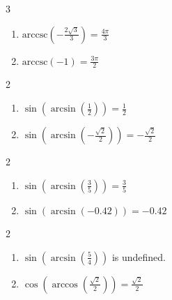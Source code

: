 \documentclass{ximera}
\begin{document}
\begin{multicols}{3} 

\begin{enumerate}

\setcounter{enumi}{\value{HW}}


\item $\mbox{arccsc} \left( -\frac{2\sqrt{3}}{3} \right) = \frac{4\pi}{3}$
\item $\mbox{arccsc} \left( -1 \right) = \frac{3\pi}{2}$ 

\setcounter{HW}{\value{enumi}}

\end{enumerate}

\end{multicols}


\begin{multicols}{2}

\begin{enumerate}

\setcounter{enumi}{\value{HW}}

\item $\sin\left(\arcsin\left(\frac{1}{2}\right)\right) = \frac{1}{2}$ 
\item $\sin\left(\arcsin\left(-\frac{\sqrt{2}}{2}\right)\right) = -\frac{\sqrt{2}}{2}$

\setcounter{HW}{\value{enumi}}

\end{enumerate}

\end{multicols}

\begin{multicols}{2}

\begin{enumerate}

\setcounter{enumi}{\value{HW}}

\item $\sin\left(\arcsin\left(\frac{3}{5}\right)\right) = \frac{3}{5}$
\item $\sin\left(\arcsin\left(-0.42\right)\right) = -0.42$ 

\setcounter{HW}{\value{enumi}}

\end{enumerate}

\end{multicols}

\begin{multicols}{2}

\begin{enumerate}

\setcounter{enumi}{\value{HW}}

\item $\sin\left(\arcsin\left(\frac{5}{4}\right)\right)$ is undefined. 
\item $\cos\left(\arccos\left(\frac{\sqrt{2}}{2}\right)\right) = \frac{\sqrt{2}}{2}$

\setcounter{HW}{\value{enumi}}

\end{enumerate}

\end{multicols}
\end{document}

